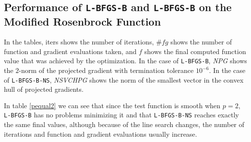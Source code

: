 \subsection{Performance of \texttt{L-BFGS-B} and \texttt{L-BFGS-B} on the Modified Rosenbrock Function}

In the tables, iters shows the number of iterations, $\#fg$ shows the number of function and gradient evaluations taken, and $f$ shows the final computed function value that was achieved by the optimization. In the case of \texttt{L-BFGS-B}, \emph{NPG} shows the $2$-norm of the projected gradient with termination tolerance $10^{-6}$. In the case of \texttt{L-BFGS-B-NS}, \emph{NSVCHPG} shows the norm of the smallest vector in the convex hull of projected gradients. 

In table \ref{pequal2} we can see that since the test function is smooth when $p = 2$, \texttt{L-BFGS-B} has no problems minimizing it and that \texttt{L-BFGS-B-NS} reaches exactly the same final values, although because of the line search changes, the number of iterations and function and gradient evaluations usually increase.

